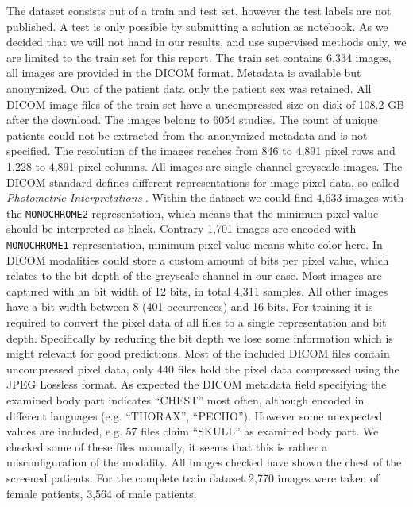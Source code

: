 The dataset consists out of a train and test set, however the test labels are not published. A test is only possible by submitting a solution as notebook. As we decided that we will not hand in our results, and use supervised methods only, we are limited to the train set for this report. The train set contains 6,334 images, all images are provided in the DICOM format. Metadata is available but anonymized. Out of the patient data only the patient sex was retained. All DICOM image files of the train set have a uncompressed size on disk of 108.2 GB after the download. The images belong to 6054 studies. The count of unique patients could not be extracted from the anonymized metadata and is not specified. The resolution of the images reaches from 846 to 4,891 pixel rows and 1,228 to 4,891 pixel columns. All images are single channel greyscale images. The DICOM standard defines different representations for image pixel data, so called \textit{Photometric Interpretations} \autocite{dicom2018}. Within the dataset we could find 4,633 images with the \texttt{MONOCHROME2} representation, which means that the minimum pixel value should be interpreted as black. Contrary 1,701 images are encoded with \texttt{MONOCHROME1} representation, minimum pixel value means white color here. In DICOM modalities could store a custom amount of bits per pixel value, which relates to the bit depth of the greyscale channel in our case. Most images are captured with an bit width of 12 bits, in total 4,311 samples. All other images have a bit width between 8 (401 occurrences) and 16 bits. For training it is required to convert the pixel data of all files to a single representation and bit depth. Specifically by reducing the bit depth we lose some information which is might relevant for good predictions. Most of the included DICOM files contain uncompressed pixel data, only 440 files hold the pixel data compressed using the JPEG Lossless format. As expected the DICOM metadata field specifying the examined body part indicates \enquote{CHEST} most often, although encoded in different languages (e.g. \enquote{THORAX}, \enquote{PECHO}). However some unexpected values are included, e.g. 57 files claim \enquote{SKULL} as examined body part. We checked some of these files manually, it seems that this is rather a misconfiguration of the modality. All images checked have shown the chest of the screened patients. For the complete train dataset 2,770 images were taken of female patients, 3,564 of male patients.

